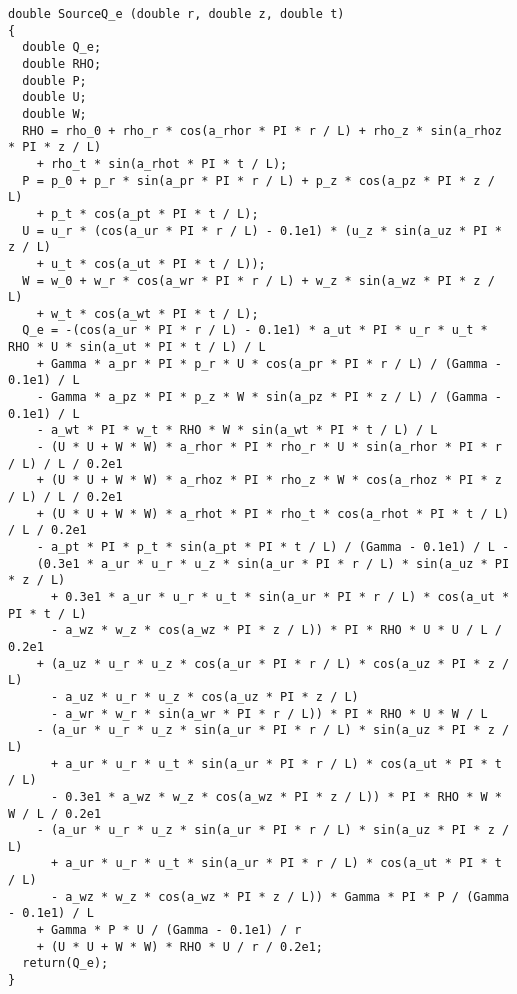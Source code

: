 \documentclass[10pt]{article}
\begin{document}
\begin{small}
\begin{verbatim}
double SourceQ_e (double r, double z, double t)
{
  double Q_e;
  double RHO;
  double P;
  double U;
  double W;
  RHO = rho_0 + rho_r * cos(a_rhor * PI * r / L) + rho_z * sin(a_rhoz * PI * z / L)
    + rho_t * sin(a_rhot * PI * t / L);
  P = p_0 + p_r * sin(a_pr * PI * r / L) + p_z * cos(a_pz * PI * z / L)
    + p_t * cos(a_pt * PI * t / L);
  U = u_r * (cos(a_ur * PI * r / L) - 0.1e1) * (u_z * sin(a_uz * PI * z / L)
    + u_t * cos(a_ut * PI * t / L));
  W = w_0 + w_r * cos(a_wr * PI * r / L) + w_z * sin(a_wz * PI * z / L)
    + w_t * cos(a_wt * PI * t / L);
  Q_e = -(cos(a_ur * PI * r / L) - 0.1e1) * a_ut * PI * u_r * u_t * RHO * U * sin(a_ut * PI * t / L) / L
    + Gamma * a_pr * PI * p_r * U * cos(a_pr * PI * r / L) / (Gamma - 0.1e1) / L
    - Gamma * a_pz * PI * p_z * W * sin(a_pz * PI * z / L) / (Gamma - 0.1e1) / L
    - a_wt * PI * w_t * RHO * W * sin(a_wt * PI * t / L) / L
    - (U * U + W * W) * a_rhor * PI * rho_r * U * sin(a_rhor * PI * r / L) / L / 0.2e1
    + (U * U + W * W) * a_rhoz * PI * rho_z * W * cos(a_rhoz * PI * z / L) / L / 0.2e1
    + (U * U + W * W) * a_rhot * PI * rho_t * cos(a_rhot * PI * t / L) / L / 0.2e1
    - a_pt * PI * p_t * sin(a_pt * PI * t / L) / (Gamma - 0.1e1) / L -
    (0.3e1 * a_ur * u_r * u_z * sin(a_ur * PI * r / L) * sin(a_uz * PI * z / L)
      + 0.3e1 * a_ur * u_r * u_t * sin(a_ur * PI * r / L) * cos(a_ut * PI * t / L)
      - a_wz * w_z * cos(a_wz * PI * z / L)) * PI * RHO * U * U / L / 0.2e1
    + (a_uz * u_r * u_z * cos(a_ur * PI * r / L) * cos(a_uz * PI * z / L)
      - a_uz * u_r * u_z * cos(a_uz * PI * z / L)
      - a_wr * w_r * sin(a_wr * PI * r / L)) * PI * RHO * U * W / L
    - (a_ur * u_r * u_z * sin(a_ur * PI * r / L) * sin(a_uz * PI * z / L)
      + a_ur * u_r * u_t * sin(a_ur * PI * r / L) * cos(a_ut * PI * t / L)
      - 0.3e1 * a_wz * w_z * cos(a_wz * PI * z / L)) * PI * RHO * W * W / L / 0.2e1
    - (a_ur * u_r * u_z * sin(a_ur * PI * r / L) * sin(a_uz * PI * z / L)
      + a_ur * u_r * u_t * sin(a_ur * PI * r / L) * cos(a_ut * PI * t / L)
      - a_wz * w_z * cos(a_wz * PI * z / L)) * Gamma * PI * P / (Gamma - 0.1e1) / L
    + Gamma * P * U / (Gamma - 0.1e1) / r
    + (U * U + W * W) * RHO * U / r / 0.2e1;
  return(Q_e);
}\end{verbatim}
\end{small}





\end{document}
